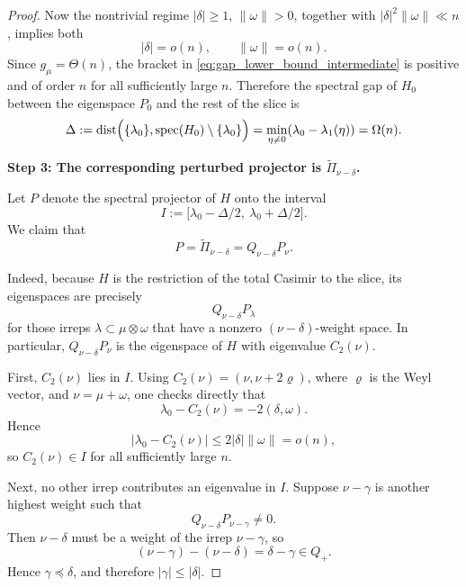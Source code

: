 \documentclass[a4paper,onecolumn,11pt]{quantumarticle}
\begin{document}
\begin{proof}
Now the nontrivial regime \(|\delta|\ge 1\), \(\|\omega\|>0\), together with \(|\delta|^2\|\omega\|\ll n\), implies both
\[
|\delta|=o(n),
\qquad
\|\omega\|=o(n).
\]
Since \(g_\mu=\Theta(n)\), the bracket in \eqref{eq:gap_lower_bound_intermediate} is positive and of order \(n\) for all sufficiently large \(n\). Therefore the spectral gap of \(H_0\) between the eigenspace \(P_0\) and the rest of the slice is
\begin{equation}\label{eq:Delta_def}
    \Delta
    :=
    \mathrm{dist}\Bigl(\{\lambda_0\},\mathrm{spec}(H_0)\setminus\{\lambda_0\}\Bigr)
    =\min_{\eta\neq 0}(\lambda_0-\lambda_1(\eta)) 
    = \Omega(n).
\end{equation}

\medskip
\noindent\textbf{Step 3: The corresponding perturbed projector is \(\widetilde{\Pi}_{\nu-\delta}\).}

Let \(P\) denote the spectral projector of \(H\) onto the interval
\[
I:=\bigl[\lambda_0-\Delta/2,\ \lambda_0+\Delta/2\bigr].
\]
We claim that
\begin{equation}\label{eq:P_equals_restricted_nu}
    P=\widetilde{\Pi}_{\nu-\delta}=Q_{\nu-\delta}P_\nu.
\end{equation}

Indeed, because \(H\) is the restriction of the total Casimir to the slice, its eigenspaces are precisely
\[
Q_{\nu-\delta}P_\lambda
\]
for those irreps \(\lambda\subset \mu\otimes\omega\) that have a nonzero \((\nu-\delta)\)-weight space. In particular, \(Q_{\nu-\delta}P_\nu\) is the eigenspace of \(H\) with eigenvalue \(C_2(\nu)\).

First, \(C_2(\nu)\) lies in \(I\). Using \(C_2(\nu)=(\nu,\nu+2\varrho)\), where \(\varrho\) is the Weyl vector, and \(\nu=\mu+\omega\), one checks directly that
\begin{equation}
    \lambda_0-C_2(\nu)
    =
    -2(\delta,\omega).
\end{equation}
Hence
\begin{equation}
    |\lambda_0-C_2(\nu)|
    \le
    2|\delta| \|\omega\|
    =
    o(n),
\end{equation}
so \(C_2(\nu)\in I\) for all sufficiently large \(n\).

Next, no other irrep contributes an eigenvalue in \(I\). Suppose \(\nu-\gamma\) is another highest weight such that
\[
Q_{\nu-\delta}P_{\nu-\gamma}\neq 0.
\]
Then \(\nu-\delta\) must be a weight of the irrep \(\nu-\gamma\), so
\[
(\nu-\gamma)-(\nu-\delta)=\delta-\gamma\in Q_+.
\]
Hence \(\gamma\preceq \delta\), and therefore \(|\gamma|\le |\delta|\).


\end{proof}
\end{document}
